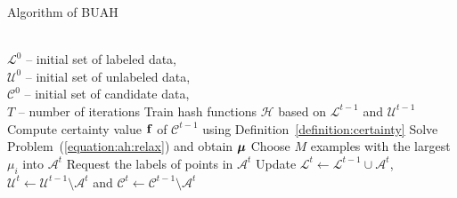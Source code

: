 \begin{algorithm}[tb]
   \caption{Algorithm of \mbox{BUAH}}
   \label{algorithm:ah}
\begin{algorithmic}
    \\
   $\mathcal{L}^{0}$ -- initial set of labeled data,\\
   $\mathcal{U}^{0}$ -- initial set of unlabeled data,\\
   $\mathcal{C}^{0}$ -- initial set of candidate data,\\
    $T$ -- number of iterations
\STATE Train hash functions $\mathcal{H}$ based on $\mathcal{L}^{t-1}$ and $\mathcal{U}^{t-1}$\;
\STATE Compute certainty value ${\bf f}$ of $\mathcal{C}^{t-1}$ using Definition~\ref{definition:certainty}\;
\STATE Solve Problem~(\ref{equation:ah:relax}) and obtain $\mbox{\boldmath$\mu$\unboldmath}$\;
\STATE Choose $M$ examples with the largest $\mu_i$ into $\mathcal{A}^{t}$\;
\STATE Request the labels of points in $\mathcal{A}^{t}$\;
\STATE Update $\mathcal{L}^{t}\leftarrow\mathcal{L}^{t-1}\cup\mathcal{A}^{t}$, $\mathcal{U}^{t}\leftarrow\mathcal{U}^{t-1}\setminus \mathcal{A}^{t}$ and $\mathcal{C}^{t}\leftarrow\mathcal{C}^{t-1}\setminus \mathcal{A}^{t}$\;
\ENDFOR
%
\end{algorithmic}
\end{algorithm}

%

%

